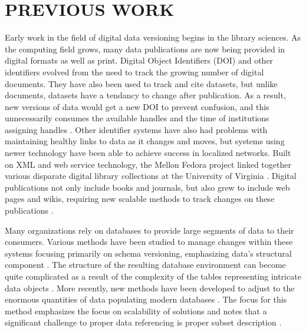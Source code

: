
\chapter{PREVIOUS WORK}
Early work in the field of digital data versioning begins in the library sciences.
As the computing field grows, many data publications are now being provided in digital formats as well as print.
Digital Object Identifiers (DOI) and other identifiers evolved from the need to track the growing number of digital documents.
They have also been used to track and cite datasets, but unlike documents, datasets have a tendancy to change after publication.
As a result, new versions of data would get a new DOI to prevent confusion, and this unnecessarily consumes the available handles and the time of institutions assigning handles \cite{Lyons2005}.
Other identifier systems have also had problems with maintaining healthy links to data as it changes and moves, but systems using newer technology have been able to achieve success in localized networks.
Built on XML and web service technology, the Mellon Fedora project linked together various disparate digital library collections at the University of Virginia  \cite{Payette2002}.
Digital publications not only include books and journals, but also grew to include web pages and wikis, requiring new scalable methods to track changes on these publications \cite{Berberich:2007:TMT:1277741.1277831}.

Many organizations rely on databases to provide large segments of data to their consumers.
Various methods have been studied to manage changes within these systems focusing primarily on schema versioning, emphasizing data's structural component \cite{roddick1996model}.
The structure of the resulting database environment can become quite complicated as a result of the complexity of the tables representing intricate data objects \cite{Klahold:1986:GMV:645913.671314}.
More recently, new methods have been developed to adjust to the enormous quantities of data populating modern databases \cite{Proell2013} \cite{DBLP:conf/data/2013}.
The focus for this method emphasizes the focus on scalability of solutions and notes that a significant challenge to proper data referencing is proper subset description \cite{proellBigData}.

